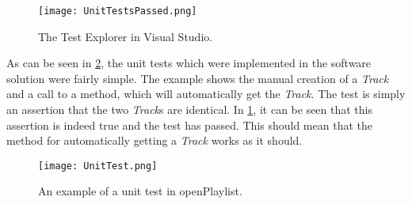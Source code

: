 \begin{figure}[H]
  \centering
  \texttt{[image: UnitTestsPassed.png]}
  \caption{The Test Explorer in Visual Studio.}\label{fig:UnitTestsPassed}
\end{figure}

As can be seen in \cref{fig:UnitTest}, the unit tests which were implemented in the software solution were fairly simple. The example shows the manual creation of a \textit{Track} and a call to a method, which will automatically get the \textit{Track}. The test is simply an assertion that the two \textit{Track}s are identical. In \cref{fig:UnitTestsPassed}, it can be seen that this assertion is indeed true and the test has passed. This should mean that the method for automatically getting a \textit{Track} works as it should.

\begin{figure}[htbp]
  \centering
  \texttt{[image: UnitTest.png]}
  \caption{An example of a unit test in openPlaylist.}\label{fig:UnitTest}
\end{figure}
